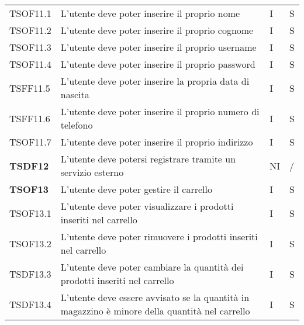 \begin{center}
\begin{longtable}[!h]{p{60px} p{240px} p{35px} p{35px}}
        TSOF11.1        & L'utente deve poter inserire il proprio nome                                                        & I              & S              \\
        TSOF11.2        & L'utente deve poter inserire il proprio cognome                                                     & I              & S              \\
        TSOF11.3        & L'utente deve poter inserire il proprio username                                                    & I              & S              \\
        TSOF11.4        & L'utente deve poter inserire il proprio password                                                    & I              & S              \\
        TSFF11.5        & L'utente deve poter inserire la propria data di nascita                                             & I              & S              \\
        TSFF11.6        & L'utente deve poter inserire il proprio numero di telefono                                          & I              & S              \\
        TSOF11.7        & L'utente deve poter inserire il proprio indirizzo                                                   & I              & S              \\
        \textbf{TSDF12} & L'utente deve potersi registrare tramite un servizio esterno                                        & NI             & /              \\
        \textbf{TSOF13} & L'utente deve poter gestire il carrello                                                             & I              & S              \\
        TSOF13.1        & L'utente deve poter visualizzare i prodotti inseriti nel carrello                                   & I              & S              \\
        TSOF13.2        & L'utente deve poter rimuovere i prodotti inseriti nel carrello                                      & I              & S              \\
        TSDF13.3        & L'utente deve poter cambiare la quantità dei prodotti inseriti nel carrello                         & I              & S              \\
        TSDF13.4        & L'utente deve essere avvisato se la quantità in magazzino è minore della quantità nel carrello      & I              & S              \\

\end{longtable}
\end{center}
